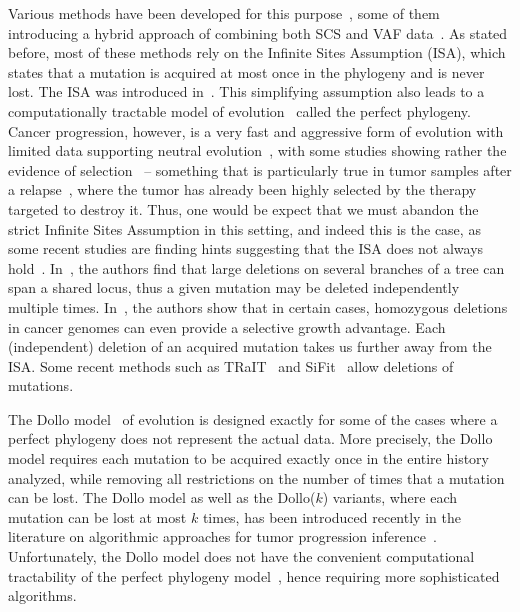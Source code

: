 \documentclass[a4paper,USenglish]{article}
\theoremstyle{definition}
\begin{document}
Various methods have been developed for this
purpose~\cite{Jahn2016,Ross2016, Zafar2017}, some of them introducing
a hybrid approach of combining both SCS and VAF
data~\cite{Ramazzotti132183, Malikic234914, Salehi2017}.  As stated
before, most of these methods rely on the Infinite Sites Assumption
(ISA), which states that a mutation is acquired at most once in the
phylogeny and is never lost. The ISA was introduced
in~\cite{Kimura1969}.  This simplifying assumption also leads to a
computationally tractable model of evolution~\cite{gusfield1991}
called the perfect phylogeny.  Cancer progression, however, is a very
fast and aggressive form of evolution with limited data supporting
neutral evolution~\cite{DAVIS2017151}, with some studies showing
rather the evidence of selection~\cite{Bignell2010,DAVIS2017151} --
something that is particularly true in tumor samples after a
relapse~\cite{Ding2012,Gillies2012,DAVIS2017151}, where the tumor has
already been highly selected by the therapy targeted to destroy it.
Thus, one would be expect that we must abandon the strict Infinite
Sites Assumption in this setting, and indeed this is the case, as some
recent studies are finding hints suggesting that the ISA does not
always hold~\cite{Kuipers13102017,Brown2017,Bignell2010}.
In~\cite{Brown2017}, the authors find that large deletions on several
branches of a tree can span a shared locus, thus a given mutation may
be deleted independently multiple times.  In~\cite{Bignell2010}, the
authors show that in certain cases, homozygous deletions in cancer
genomes can even provide a selective growth advantage. Each
(independent) deletion of an acquired mutation takes us further away
from the ISA. Some recent methods such as
TRaIT~\cite{Ramazzotti132183} and SiFit~\cite{Zafar2017} allow
deletions of mutations.

The Dollo model~\cite{Rogozin2006} of evolution is designed exactly
for some of the cases where a perfect phylogeny does not represent the
actual data.  More precisely, the Dollo model requires each mutation
to be acquired exactly once in the entire history analyzed, while
removing all restrictions on the number of times that a mutation can
be lost.  The Dollo model as well as the Dollo($k$) variants, where
each mutation can be lost at most $k$ times, has been introduced
recently in the literature on algorithmic approaches for tumor
progression
inference~\cite{Bonizzoni:2017:BPP:3107411.3107441,Ciccolella268243}.
Unfortunately, the Dollo model does not have the convenient
computational tractability of the perfect phylogeny
model~\cite{gusfield1991}, hence requiring more sophisticated
algorithms.
\end{document}
